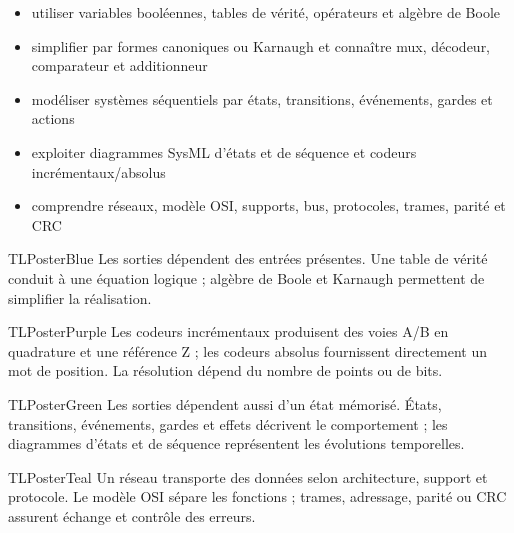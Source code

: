\documentclass[10pt,a3paper]{article}
\begin{document}
\vspace{2mm}
\begin{minipage}[t]{0.61\linewidth}
\begin{TLPosterSavoirs}
\begin{itemize}
  \item utiliser variables booléennes, tables de vérité, opérateurs et algèbre de Boole
  \item simplifier par formes canoniques ou Karnaugh et connaître mux, décodeur, comparateur et additionneur
  \item modéliser systèmes séquentiels par états, transitions, événements, gardes et actions
  \item exploiter diagrammes SysML d'états et de séquence et codeurs incrémentaux/absolus
  \item comprendre réseaux, modèle OSI, supports, bus, protocoles, trames, parité et CRC
\end{itemize}
\end{TLPosterSavoirs}
\end{minipage}\hfill
\begin{minipage}[t]{0.36\linewidth}
\end{minipage}
\vfill
\begin{minipage}[t]{0.49\linewidth}
\begin{TLPosterBloc}{TLPosterBlue}
Les sorties dépendent des entrées présentes. Une table de vérité conduit à une équation logique ; algèbre de Boole et Karnaugh permettent de simplifier la réalisation.
\end{TLPosterBloc}
\begin{TLPosterBloc}[Codeurs]{TLPosterPurple}
Les codeurs incrémentaux produisent des voies A/B en quadrature et une référence Z ; les codeurs absolus fournissent directement un mot de position. La résolution dépend du nombre de points ou de bits.
\end{TLPosterBloc}
\end{minipage}\hfill
\begin{minipage}[t]{0.49\linewidth}
\begin{TLPosterBloc}{TLPosterGreen}
Les sorties dépendent aussi d'un état mémorisé. États, transitions, événements, gardes et effets décrivent le comportement ; les diagrammes d'états et de séquence représentent les évolutions temporelles.
\end{TLPosterBloc}
\begin{TLPosterBloc}{TLPosterTeal}
Un réseau transporte des données selon architecture, support et protocole. Le modèle OSI sépare les fonctions ; trames, adressage, parité ou CRC assurent échange et contrôle des erreurs.
\end{TLPosterBloc}
\end{minipage}
\end{document}
